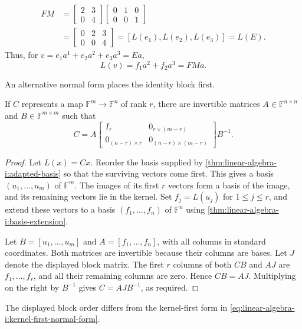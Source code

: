 \begin{example}
\[\begin{aligned}
      FM
        &=\begin{bmatrix}2&3\\0&4\end{bmatrix}
          \begin{bmatrix}0&1&0\\0&0&1\end{bmatrix}\\
        &=\begin{bmatrix}0&2&3\\0&0&4\end{bmatrix}
          =[L(e_1),L(e_2),L(e_3)]=L(E).
    \end{aligned}
  \]
  Thus, for \(v=e_1a^1+e_2a^2+e_3a^3=Ea\),
  \[
    L(v)=f_1a^2+f_2a^3=FMa.
  \]
\end{example}



An alternative normal form places the identity block first.
\begin{proposition}
  \label{thm:linear-algebra-i:image-first-normal-form}
  If \(C\) represents a map \(\mathbb F^m\to\mathbb F^n\) of rank
  \(r\), there are invertible matrices \(A\in\mathbb F^{n\times n}\)
  and \(B\in\mathbb F^{m\times m}\) such that
  \[
    C=A
    \begin{bmatrix}
      I_r&0_{r\times(m-r)}\\
      0_{(n-r)\times r}&0_{(n-r)\times(m-r)}
    \end{bmatrix}
    B^{-1}.
  \]
\end{proposition}

\begin{pendingreview}
\begin{proof}
  Let \(L(x)=Cx\). Reorder the basis supplied by
  \autoref{thm:linear-algebra-i:adapted-basis} so that the surviving
  vectors come first. This gives a basis \((u_1,\ldots,u_m)\) of
  \(\mathbb F^m\). The images of its first \(r\) vectors form a basis
  of the image, and its remaining vectors lie in the kernel.
  Set \(f_j=L(u_j)\) for \(1\leq j\leq r\), and extend these vectors
  to a basis \((f_1,\ldots,f_n)\) of \(\mathbb F^n\) using
  \autoref{thm:linear-algebra-i:basis-extension}.

  Let \(B=[u_1,\ldots,u_m]\) and \(A=[f_1,\ldots,f_n]\), with all
  columns in standard coordinates. Both matrices are invertible because
  their columns are bases. Let \(J\) denote the displayed block matrix.
  The first \(r\) columns of both \(CB\) and \(AJ\) are
  \(f_1,\ldots,f_r\), and all their remaining columns are zero.
  Hence \(CB=AJ\). Multiplying on the right by \(B^{-1}\) gives
  \(C=AJB^{-1}\), as required.
\end{proof}
\end{pendingreview}

The displayed block order differs from the kernel-first form in
\autoref{eq:linear-algebra-i:kernel-first-normal-form}.


